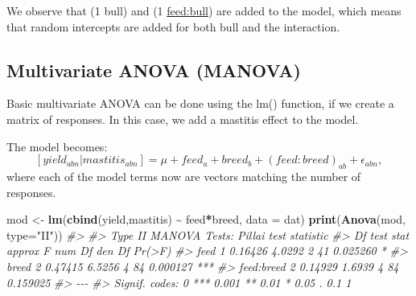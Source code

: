 \documentclass[
]{article}
\newenvironment{Shaded}{\begin{snugshade}}{\end{snugshade}}
\newcommand{\AttributeTok}[1]{\textcolor[rgb]{0.13,0.29,0.53}{#1}}
\newcommand{\CommentTok}[1]{\textcolor[rgb]{0.56,0.35,0.01}{\textit{#1}}}
\newcommand{\DecValTok}[1]{\textcolor[rgb]{0.00,0.00,0.81}{#1}}
\newcommand{\FunctionTok}[1]{\textcolor[rgb]{0.13,0.29,0.53}{\textbf{#1}}}
\newcommand{\NormalTok}[1]{#1}
\newcommand{\OtherTok}[1]{\textcolor[rgb]{0.56,0.35,0.01}{#1}}
\newcommand{\SpecialCharTok}[1]{\textcolor[rgb]{0.81,0.36,0.00}{\textbf{#1}}}
\newcommand{\StringTok}[1]{\textcolor[rgb]{0.31,0.60,0.02}{#1}}
\begin{document}
We observe that (1 \textbar{} bull) and (1 \textbar{} \url{feed:bull})
are added to the model, which means that random intercepts are added for
both bull and the interaction.

\subsection{Multivariate ANOVA
(MANOVA)}\label{multivariate-anova-manova}

Basic multivariate ANOVA can be done using the lm() function, if we
create a matrix of responses. In this case, we add a mastitis effect to
the model.

\begin{Shaded}
\end{Shaded}

The model becomes:
\[[yield_{abn} | mastitis_{abn}] = \mu + feed_a + breed_b + (feed:breed)_{ab} + \epsilon_{abn},\]
where each of the model terms now are vectors matching the number of
responses.

\begin{Shaded}
\begin{Highlighting}[]
\NormalTok{mod }\OtherTok{\textless{}{-}} \FunctionTok{lm}\NormalTok{(}\FunctionTok{cbind}\NormalTok{(yield,mastitis) }\SpecialCharTok{\textasciitilde{}}\NormalTok{ feed}\SpecialCharTok{*}\NormalTok{breed, }\AttributeTok{data =}\NormalTok{ dat)}
\FunctionTok{print}\NormalTok{(}\FunctionTok{Anova}\NormalTok{(mod, }\AttributeTok{type=}\StringTok{"II"}\NormalTok{))}
\CommentTok{\#\textgreater{} }
\CommentTok{\#\textgreater{} Type II MANOVA Tests: Pillai test statistic}
\CommentTok{\#\textgreater{}            Df test stat approx F num Df den Df   Pr(\textgreater{}F)    }
\CommentTok{\#\textgreater{} feed        1   0.16426   4.0292      2     41 0.025260 *  }
\CommentTok{\#\textgreater{} breed       2   0.47415   6.5256      4     84 0.000127 ***}
\CommentTok{\#\textgreater{} feed:breed  2   0.14929   1.6939      4     84 0.159025    }
\CommentTok{\#\textgreater{} {-}{-}{-}}
\CommentTok{\#\textgreater{} Signif. codes:  0 \textquotesingle{}***\textquotesingle{} 0.001 \textquotesingle{}**\textquotesingle{} 0.01 \textquotesingle{}*\textquotesingle{} 0.05 \textquotesingle{}.\textquotesingle{} 0.1 \textquotesingle{} \textquotesingle{} 1}
\end{Highlighting}
\end{Shaded}
\end{document}
